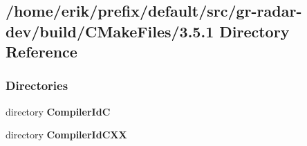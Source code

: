 \subsection{/home/erik/prefix/default/src/gr-\/radar-\/dev/build/\+C\+Make\+Files/3.5.1 Directory Reference}
\label{dir_4b6c3f1b83ae8f2c08de7cab952c7672}
\subsubsection*{Directories}
\begin{DoxyCompactItemize}
\item 
directory {\bf Compiler\+IdC}
\item 
directory {\bf Compiler\+Id\+C\+XX}
\end{DoxyCompactItemize}

